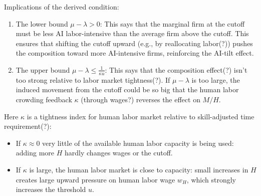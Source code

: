 \documentclass[english]{article}
\begin{document}
Implications of the derived condition:
\begin{enumerate}
    \item The lower bound $\mu - \lambda > 0$: This says that the marginal firm at the cutoff must be less AI labor-intensive than the average firm above the cutoff. This ensures that shifting the cutoff upward (e.g., by reallocating labor(?)) pushes the composition toward more AI-intensive firms, reinforcing the AI-tilt effect.
    \item The upper bound $\mu - \lambda \leq \frac{1}{\kappa u}$: This says that the composition effect(?) isn't too strong relative to labor market tightness(?). If $\mu - \lambda$ is too large, the induced movement from the cutoff could be so big that the human labor crowding feedback $\kappa$ (through wages?) reverses the effect on $M/H$.
\end{enumerate}

Here $\kappa$ is a tightness index for human labor market relative to skill-adjusted time requirement(?):
\begin{itemize}
    \item If $\kappa \approx 0$ very little of the available human labor capacity is being used: adding more $H$ hardly changes wages or the cutoff.
    \item If $\kappa$ is large, the human labor market is close to capacity: small increases in $H$ creates large upward pressure on human labor wage $w_H$, which strongly increases the threshold $u$.
\end{itemize}
\end{document}
